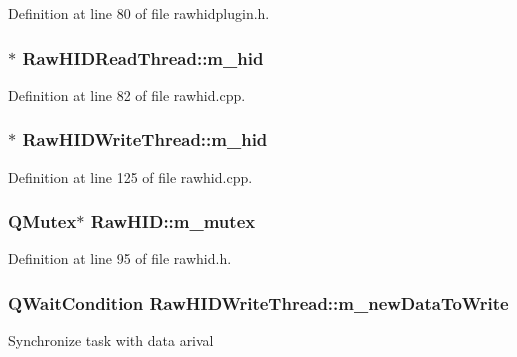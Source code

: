 Definition at line 80 of file rawhidplugin.\-h.

\hypertarget{group___raw_h_i_d_plugin_gae4904e50399d18b7cce82e865d43dcbc}{
\subsubsection[{m\-\_\-hid}]{$\ast$ Raw\-H\-I\-D\-Read\-Thread\-::m\-\_\-hid\hspace{0.3cm}{\ttfamily [protected]}}}\label{group___raw_h_i_d_plugin_gae4904e50399d18b7cce82e865d43dcbc}


Definition at line 82 of file rawhid.\-cpp.

\hypertarget{group___raw_h_i_d_plugin_ga753f0d79e5633e60df867fe7c35dd6e4}{
\subsubsection[{m\-\_\-hid}]{$\ast$ Raw\-H\-I\-D\-Write\-Thread\-::m\-\_\-hid\hspace{0.3cm}{\ttfamily [protected]}}}\label{group___raw_h_i_d_plugin_ga753f0d79e5633e60df867fe7c35dd6e4}


Definition at line 125 of file rawhid.\-cpp.

\hypertarget{group___raw_h_i_d_plugin_ga915d676c812135bc006e37a140a52365}{
\subsubsection[{m\-\_\-mutex}]{\setlength{\rightskip}{0pt plus 5cm}Q\-Mutex$\ast$ Raw\-H\-I\-D\-::m\-\_\-mutex\hspace{0.3cm}{\ttfamily [protected]}}}\label{group___raw_h_i_d_plugin_ga915d676c812135bc006e37a140a52365}


Definition at line 95 of file rawhid.\-h.

\hypertarget{group___raw_h_i_d_plugin_ga1554ff98394a7da1f15042ff26061348}{
\subsubsection[{m\-\_\-new\-Data\-To\-Write}]{\setlength{\rightskip}{0pt plus 5cm}Q\-Wait\-Condition Raw\-H\-I\-D\-Write\-Thread\-::m\-\_\-new\-Data\-To\-Write\hspace{0.3cm}{\ttfamily [protected]}}}\label{group___raw_h_i_d_plugin_ga1554ff98394a7da1f15042ff26061348}
Synchronize task with data arival 

